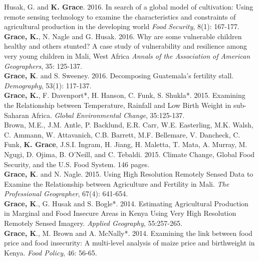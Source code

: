 \documentclass[11pt]{article} %
\begin{document}
\noindent
Husak, G. and \textbf{K. Grace}. 2016. In search of a global model of cultivation:  Using remote sensing technology to examine the characteristics and constraints of agricultural production in the developing world \textit{Food Security}, 8(1): 167-177.\\

\noindent
\textbf{Grace, K.}, N. Nagle and G. Husak. 2016. Why are some vulnerable children healthy and others stunted?  A case study of vulnerability and resilience among very young children in Mali, West Africa \textit{Annals of the Association of American Geographers}, 35: 125-137.\\

\noindent
\textbf{Grace, K}. and S. Sweeney. 2016.  Decomposing Guatemala's fertility stall. \textit{Demography}, 53(1): 117-137.\\

\noindent
\textbf{Grace, K.}, F. Davenport*, H. Hanson, C. Funk, S. Shukla*. 2015. Examining the Relationship between Temperature, Rainfall and Low Birth Weight in sub-Saharan Africa.  \textit{Global Environmental Change}, 35:125-137.\\

\noindent
Brown, M.E., J.M. Antle, P. Backlund, E.R. Carr, W.E. Easterling, M.K. Walsh, C. Ammann, W. Attavanich, C.B. Barrett, M.F. Bellemare, V. Dancheck, C. Funk, \textbf{K. Grace}, J.S.I. Ingram, H. Jiang, H. Maletta, T. Mata, A. Murray, M. Ngugi, D. Ojima, B. O'Neill, and C. Tebaldi. 2015. Climate Change, Global Food Security, and the U.S. Food System. 146 pages.
 \\

\noindent
\textbf{Grace, K}. and N. Nagle. 2015. Using High Resolution Remotely Sensed Data to Examine the Relationship between Agriculture and Fertility in Mali.  \textit{The Professional Geographer}, 67(4): 641-654.\\

\noindent
\textbf{Grace, K}., G. Husak and S. Bogle*. 2014.  Estimating Agricultural Production in Marginal and Food Insecure Areas in Kenya Using Very High Resolution Remotely Sensed Imagery. \textit{Applied Geography}, 55:257-265.\\

\noindent
\textbf{Grace, K}., M. Brown and A. McNally*. 2014. Examining the link between food price and food insecurity:  A multi-level analysis of maize price and birthweight in Kenya.   \textit{Food Policy}, 46: 56-65. \\
\end{document}
